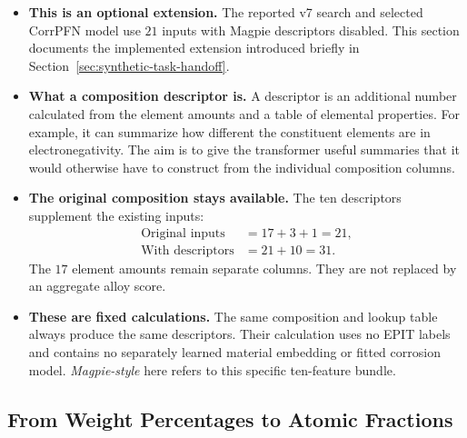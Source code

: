 \documentclass[11pt]{article}
\newenvironment{notes}
  {\begin{itemize}\setlength{\itemsep}{0.45em}\setlength{\parsep}{0pt}}
  {\end{itemize}}
\begin{document}
\begin{notes}
    \item \textbf{This is an optional extension.}
    The reported v7 search and selected CorrPFN model use
    \(21\) inputs with Magpie descriptors disabled.
    This section documents the implemented extension
    introduced briefly in
    Section~\ref{sec:synthetic-task-handoff}.

    \item \textbf{What a composition descriptor is.}
    A descriptor is an additional number calculated from
    the element amounts and a table of elemental properties.
    For example, it can summarize how different the
    constituent elements are in electronegativity.
    The aim is to give the transformer useful summaries
    that it would otherwise have to construct from the
    individual composition columns.

    \item \textbf{The original composition stays available.}
    The ten descriptors supplement the existing inputs:
    \[
    \begin{aligned}
        \text{Original inputs}&=17+3+1=21,\\
        \text{With descriptors}&=21+10=31.
    \end{aligned}
    \]
    The \(17\) element amounts remain separate columns.
    They are not replaced by an aggregate alloy score.

    \item \textbf{These are fixed calculations.}
    The same composition and lookup table always produce
    the same descriptors. Their calculation uses no EPIT
    labels and contains no separately learned material
    embedding or fitted corrosion model.
    \emph{Magpie-style} here refers to this specific
    ten-feature bundle.
\end{notes}

\subsection{From Weight Percentages to Atomic Fractions}
\label{sec:magpie-atomic-fractions}
\end{document}
